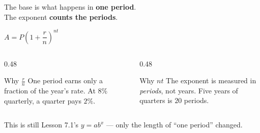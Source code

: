 \documentclass[aspectratio=169, 11pt]{beamer}
\begin{document}
\begin{frame}[t, plain]
  \begin{center}
    \Large The base is what happens in \textbf{one period}. \\[4pt]
    The exponent \textbf{counts the periods}.
  \end{center}
  \vspace{8pt}
  \begin{center}
    \Large $A = P\left(1+\dfrac{r}{n}\right)^{nt}$
  \end{center}
  \vspace{6pt}
  \begin{columns}[T]
    \begin{column}{0.48\textwidth}
      \begin{block}{Why $\frac{r}{n}$}
        \footnotesize One period earns only a fraction of the year's rate. At $8\%$ quarterly, a
        quarter pays $2\%$.
      \end{block}
    \end{column}
    \begin{column}{0.48\textwidth}
      \begin{block}{Why $nt$}
        \footnotesize The exponent is measured in \emph{periods}, not years. Five years of quarters is
        $20$ periods.
      \end{block}
    \end{column}
  \end{columns}
  \vspace{5pt}
  \begin{center}{\footnotesize This is still Lesson 7.1's $y=ab^{x}$ --- only the length of ``one
  period'' changed.}\end{center}
\end{frame}
\end{document}
